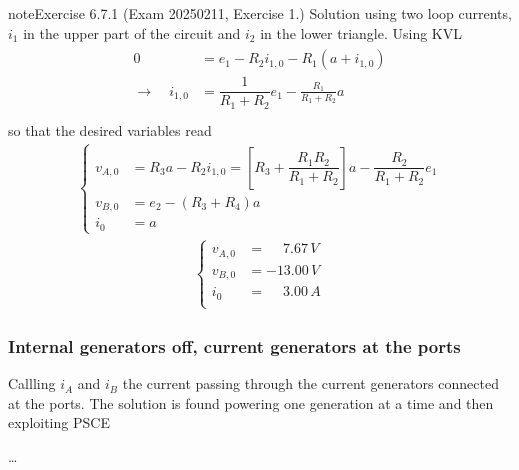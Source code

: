 \documentclass[letterpaper,10pt,english]{jupyterBook}
\begin{document}
\begin{sphinxadmonition}{note}{Exercise 6.7.1 (Exam 2025\sphinxhyphen{}02\sphinxhyphen{}11, Exercise 1.)}
\sphinxAtStartPar
Solution using two loop currents, \(i_1\) in the upper part of the circuit and \(i_2\) in the lower triangle. Using KVL
\begin{equation*}
\begin{split}\begin{aligned}
  0 & = e_1 - R_2 i_{1,0} - R_1 (a + i_{1,0}) \\
  \rightarrow \quad i_{1,0} & = \dfrac{1}{R_1+R_2} e_1 - \frac{R_1}{R_1 + R_2} a \\
\end{aligned}\end{split}
\end{equation*}
\sphinxAtStartPar
so that the desired variables read
\begin{equation*}
\begin{split}\begin{cases}
  v_{A,0} & = R_3 a - R_2 i_{1,0} = \left[ R_3 + \dfrac{R_1 R_2}{R_1 + R_2} \right] a - \dfrac{R_2}{R_1+R_2} e_1 \\
  v_{B,0} & = e_2 - (R_3 + R_4) a \\
  i_{0} & = a
\end{cases}\end{split}
\end{equation*}\begin{equation*}
\begin{split}\begin{cases}
 v_{A,0} & = \quad\ 7.67 \, V \\
 v_{B,0} & =      -13.00 \, V \\
   i_{0} & = \quad\ 3.00 \, A \\
\end{cases}\end{split}
\end{equation*}
\begin{figure}[htbp]
\centering

\noindent{}
\end{figure}
\subsubsection*{Internal generators off, current generators at the ports}

\sphinxAtStartPar
Callling \(i_A\) and \(i_B\) the current passing through the current generators connected at the ports. The solution is found powering one generation at a time and then exploiting PSCE

\sphinxAtStartPar
{} …


\end{sphinxadmonition}
\end{document}
